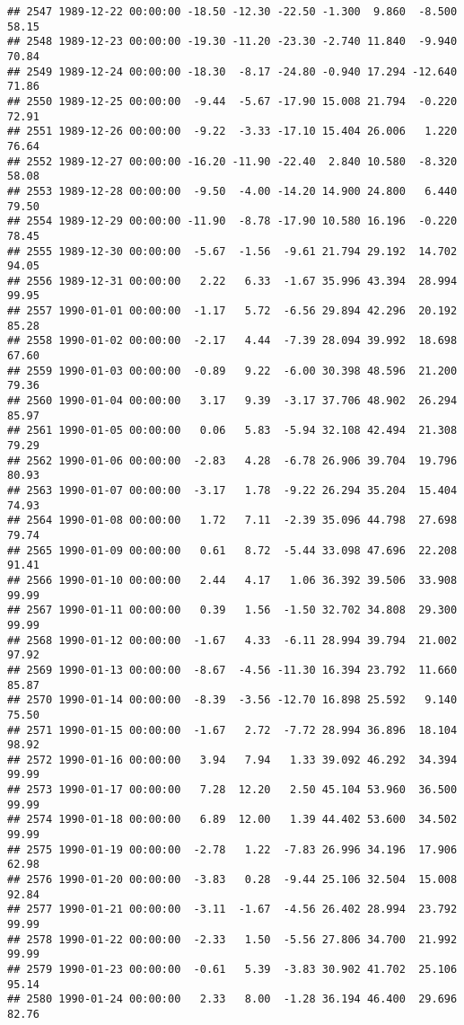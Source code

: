 \documentclass{article}\usepackage{graphicx, color}
\makeatletter
\newenvironment{kframe}{%
 \def\at@end@of@kframe{}%
 \ifinner\ifhmode%
  \def\at@end@of@kframe{\end{minipage}}%
  \begin{minipage}{\columnwidth}%
 \fi\fi%
 \def\FrameCommand##1{\hskip\@totalleftmargin \hskip-\fboxsep
 \colorbox{shadecolor}{##1}\hskip-\fboxsep
     \hskip-\linewidth \hskip-\@totalleftmargin \hskip\columnwidth}%
 \MakeFramed {\advance\hsize-\width
   \@totalleftmargin\z@ \linewidth\hsize
   \@setminipage}}%
 {\par\unskip\endMakeFramed%
 \at@end@of@kframe}
\newenvironment{knitrout}{}{} %
\makeatother
\begin{document}
\begin{knitrout}
\begin{kframe}
\begin{verbatim}
## 2547 1989-12-22 00:00:00 -18.50 -12.30 -22.50 -1.300  9.860  -8.500  58.15
## 2548 1989-12-23 00:00:00 -19.30 -11.20 -23.30 -2.740 11.840  -9.940  70.84
## 2549 1989-12-24 00:00:00 -18.30  -8.17 -24.80 -0.940 17.294 -12.640  71.86
## 2550 1989-12-25 00:00:00  -9.44  -5.67 -17.90 15.008 21.794  -0.220  72.91
## 2551 1989-12-26 00:00:00  -9.22  -3.33 -17.10 15.404 26.006   1.220  76.64
## 2552 1989-12-27 00:00:00 -16.20 -11.90 -22.40  2.840 10.580  -8.320  58.08
## 2553 1989-12-28 00:00:00  -9.50  -4.00 -14.20 14.900 24.800   6.440  79.50
## 2554 1989-12-29 00:00:00 -11.90  -8.78 -17.90 10.580 16.196  -0.220  78.45
## 2555 1989-12-30 00:00:00  -5.67  -1.56  -9.61 21.794 29.192  14.702  94.05
## 2556 1989-12-31 00:00:00   2.22   6.33  -1.67 35.996 43.394  28.994  99.95
## 2557 1990-01-01 00:00:00  -1.17   5.72  -6.56 29.894 42.296  20.192  85.28
## 2558 1990-01-02 00:00:00  -2.17   4.44  -7.39 28.094 39.992  18.698  67.60
## 2559 1990-01-03 00:00:00  -0.89   9.22  -6.00 30.398 48.596  21.200  79.36
## 2560 1990-01-04 00:00:00   3.17   9.39  -3.17 37.706 48.902  26.294  85.97
## 2561 1990-01-05 00:00:00   0.06   5.83  -5.94 32.108 42.494  21.308  79.29
## 2562 1990-01-06 00:00:00  -2.83   4.28  -6.78 26.906 39.704  19.796  80.93
## 2563 1990-01-07 00:00:00  -3.17   1.78  -9.22 26.294 35.204  15.404  74.93
## 2564 1990-01-08 00:00:00   1.72   7.11  -2.39 35.096 44.798  27.698  79.74
## 2565 1990-01-09 00:00:00   0.61   8.72  -5.44 33.098 47.696  22.208  91.41
## 2566 1990-01-10 00:00:00   2.44   4.17   1.06 36.392 39.506  33.908  99.99
## 2567 1990-01-11 00:00:00   0.39   1.56  -1.50 32.702 34.808  29.300  99.99
## 2568 1990-01-12 00:00:00  -1.67   4.33  -6.11 28.994 39.794  21.002  97.92
## 2569 1990-01-13 00:00:00  -8.67  -4.56 -11.30 16.394 23.792  11.660  85.87
## 2570 1990-01-14 00:00:00  -8.39  -3.56 -12.70 16.898 25.592   9.140  75.50
## 2571 1990-01-15 00:00:00  -1.67   2.72  -7.72 28.994 36.896  18.104  98.92
## 2572 1990-01-16 00:00:00   3.94   7.94   1.33 39.092 46.292  34.394  99.99
## 2573 1990-01-17 00:00:00   7.28  12.20   2.50 45.104 53.960  36.500  99.99
## 2574 1990-01-18 00:00:00   6.89  12.00   1.39 44.402 53.600  34.502  99.99
## 2575 1990-01-19 00:00:00  -2.78   1.22  -7.83 26.996 34.196  17.906  62.98
## 2576 1990-01-20 00:00:00  -3.83   0.28  -9.44 25.106 32.504  15.008  92.84
## 2577 1990-01-21 00:00:00  -3.11  -1.67  -4.56 26.402 28.994  23.792  99.99
## 2578 1990-01-22 00:00:00  -2.33   1.50  -5.56 27.806 34.700  21.992  99.99
## 2579 1990-01-23 00:00:00  -0.61   5.39  -3.83 30.902 41.702  25.106  95.14
## 2580 1990-01-24 00:00:00   2.33   8.00  -1.28 36.194 46.400  29.696  82.76

\end{verbatim}
\end{kframe}
\end{knitrout}
\end{document}
